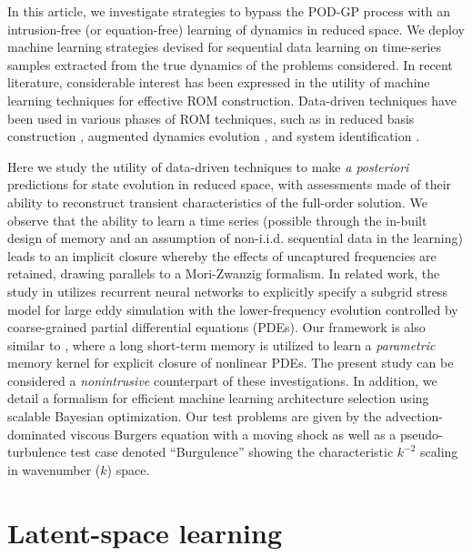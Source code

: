 \documentclass[preprint,12pt]{elsarticle}
\begin{document}
In this article, we investigate strategies to bypass the POD-GP process with an intrusion-free (or equation-free) learning of dynamics in reduced space. We deploy machine learning strategies devised for sequential data learning on time-series samples extracted from the true dynamics of the problems considered. In recent literature,  considerable interest has been expressed in the utility of machine learning techniques for effective ROM construction. Data-driven techniques have been used in various phases of ROM techniques, such as in reduced basis construction \cite{lee2019model}, augmented dynamics evolution \cite{lusch2018deep,mohan2018deep,san2018neural,san2018extreme,guo2019data,san2019artificial,mohebujjaman2019physically,wang2019non,yeo2019deep,mohan2019compressed}, and system identification \cite{brunton2016discovering,kutz2016dynamic,rudy2017data,champion2019data,raissi2017physics}. 

Here we study the utility of data-driven techniques to make \emph{a posteriori} predictions for state evolution in reduced space, with assessments made of their ability to reconstruct transient characteristics of the full-order solution. 
We observe that the ability to learn a time series (possible through the in-built design of memory and an assumption of non-i.i.d. sequential data in the learning) 
leads to an implicit closure whereby the effects of uncaptured frequencies are retained, drawing parallels to a Mori-Zwanzig formalism. In related work, the study in \cite{ma2018model} utilizes recurrent neural networks to explicitly specify a subgrid stress model for large eddy simulation with the lower-frequency evolution controlled by coarse-grained partial differential equations (PDEs). Our framework is also similar to \citep{wang2019recurrent}, where a long short-term memory 
 is utilized to learn a \emph{parametric} memory kernel for explicit closure of nonlinear PDEs. The present study can be considered a \emph{nonintrusive} counterpart of these investigations. In addition, we  detail a formalism for efficient machine learning architecture selection using scalable Bayesian optimization. Our test problems are given by the advection-dominated viscous Burgers equation \cite{san2018neural} with a moving shock as well as a pseudo-turbulence test case denoted ``Burgulence'' \cite{bec2007burgers,maulik2018explicit} showing the characteristic $k^{-2}$ scaling in wavenumber ($k$) space.

\section{Latent-space learning}
\end{document}
